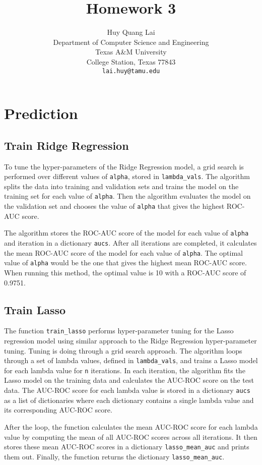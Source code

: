 \documentclass{article}
\title{Homework 3}
\author{
    Huy Quang Lai \\
    Department of Computer Science and Engineering\\
    Texas A\&M University\\
    College Station, Texas 77843 \\
    \texttt{lai.huy@tamu.edu} \\
}
\begin{document}
\maketitle

\section{Prediction}
\subsection{Train Ridge Regression}

To tune the hyper-parameters of the Ridge Regression model, a grid search is performed over different values of \verb+alpha+, stored in \verb+lambda_vals+. The algorithm splits the data into training and validation sets and trains the model on the training set for each value of \verb+alpha+. Then the algorithm evaluates the model on the validation set and chooses the value of \verb+alpha+ that gives the highest ROC-AUC score.

\noindent
The algorithm stores the ROC-AUC score of the model for each value of \verb+alpha+ and iteration in a dictionary \verb+aucs+. After all iterations are completed, it calculates the mean ROC-AUC score of the model for each value of \verb+alpha+. The optimal value of \verb+alpha+ would be the one that gives the highest mean ROC-AUC score. When running this method, the optimal value is 10 with a ROC-AUC score of 0.9751.

\subsection{Train Lasso}

The function \verb+train_lasso+ performs hyper-parameter tuning for the Lasso regression model using similar approach to the Ridge Regression hyper-parameter tuning. Tuning is doing through a grid search approach.
The algorithm loops through a set of lambda values, defined in \verb+lambda_vals+, and trains a Lasso model for each lambda value for \verb+n+ iterations.
In each iteration, the algorithm fits the Lasso model on the training data and calculates the AUC-ROC score on the test data.
The AUC-ROC score for each lambda value is stored in a dictionary \verb+aucs+ as a list of dictionaries where each dictionary contains a single lambda value and its corresponding AUC-ROC score.

\noindent
After the loop, the function calculates the mean AUC-ROC score for each lambda value by computing the mean of all AUC-ROC scores across all iterations. It then stores these mean AUC-ROC scores in a dictionary \verb+lasso_mean_auc+ and prints them out. Finally, the function returns the dictionary \verb+lasso_mean_auc+.
\end{document}
